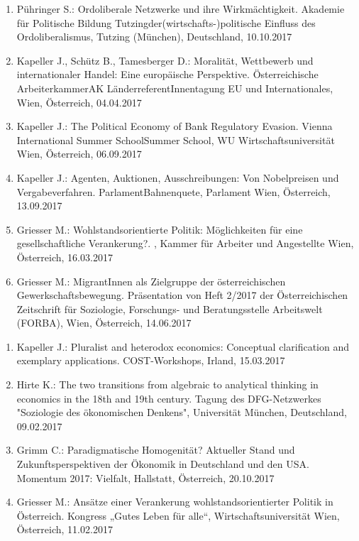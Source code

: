 \begin{enumerate}
	\item Pühringer S.: Ordoliberale Netzwerke und ihre Wirkmächtigkeit. Akademie für Politische Bildung Tutzingder(wirtschafts-)politische Einfluss des Ordoliberalismus, Tutzing (München), Deutschland, 10.10.2017
	\item Kapeller J., Schütz B., Tamesberger D.: Moralität, Wettbewerb und internationaler Handel: Eine europäische Perspektive. Österreichische ArbeiterkammerAK LänderreferentInnentagung EU und Internationales, Wien, Österreich, 04.04.2017
	\item Kapeller J.: The Political Economy of Bank Regulatory Evasion. Vienna International Summer SchoolSummer School, WU Wirtschaftsuniversität Wien, Österreich, 06.09.2017
	\item Kapeller J.: Agenten, Auktionen, Ausschreibungen: Von Nobelpreisen und Vergabeverfahren. ParlamentBahnenquete, Parlament Wien, Österreich, 13.09.2017
	\item Griesser M.: Wohlstandsorientierte Politik: Möglichkeiten für eine gesellschaftliche Verankerung?. , Kammer für Arbeiter und Angestellte Wien, Österreich, 16.03.2017
	\item Griesser M.: MigrantInnen als Zielgruppe der österreichischen Gewerkschaftsbewegung. Präsentation von Heft 2/2017 der Österreichischen Zeitschrift für Soziologie, Forschungs- und Beratungsstelle Arbeitswelt (FORBA), Wien, Österreich, 14.06.2017
\end{enumerate}

\begin{enumerate}
	\item Kapeller J.: Pluralist and heterodox economics: Conceptual clarification and exemplary applications. COST-Workshops, Irland, 15.03.2017
	\item Hirte K.: The two transitions from algebraic to analytical thinking in economics in the 18th and 19th century. Tagung des DFG-Netzwerkes "Soziologie des ökonomischen Denkens", Universität München, Deutschland, 09.02.2017
	\item Grimm C.: Paradigmatische Homogenität? Aktueller Stand und  Zukunftsperspektiven der Ökonomik in Deutschland und den USA. Momentum 2017: Vielfalt, Hallstatt, Österreich, 20.10.2017
	\item Griesser M.: Ansätze einer Verankerung wohlstandsorientierter Politik in Österreich. Kongress „Gutes Leben für alle“, Wirtschaftsuniversität Wien, Österreich, 11.02.2017
\end{enumerate}


